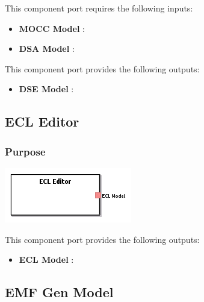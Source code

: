 \documentclass{gemoc} %
\begin{document}
This component port requires the following inputs:
\begin{itemize}
  \item \textbf{MOCC Model} :
  \item \textbf{DSA Model} :
\end{itemize}

This component port provides the following outputs:
\begin{itemize}
  \item \textbf{DSE Model} :
\end{itemize}


\subsection{ECL Editor}


\subsubsection{Purpose}


\begin{center}
\includegraphics*[trim=0.0cm 0.0cm 0cm 0.0cm, clip=true]{../images/generated/Generated_ECL_Editor.png}
\end{center}


This component port provides the following outputs:
\begin{itemize}
  \item \textbf{ECL Model} :
\end{itemize}


\subsection{EMF Gen Model}
\end{document}
